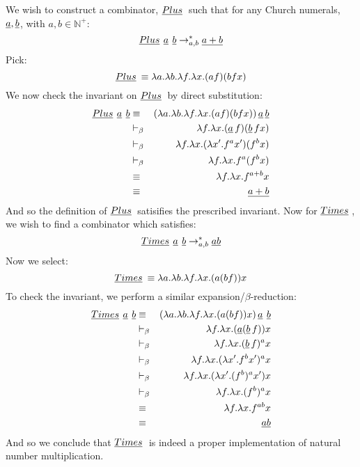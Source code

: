 \documentclass{article}
\begin{document}
We wish to construct a combinator, $\mathop{\underline{Plus}} \:$ such that for any Church numerals, $\mathop{\underline{a}}, \mathop{\underline{b}}$, with $a, b \in \mathbb{N}^+$:
\[ \mathop{\underline{Plus}} \: \mathop{\underline{a}} \: \mathop{\underline{b}} \to^*_{a,b} \mathop{\underline{a + b}} \]
Pick:
\[ \mathop{\underline{Plus}} \: \equiv \lambda a . \lambda b . \lambda f . \lambda x . (a f) (b f x) \]
We now check the invariant on $\mathop{\underline{Plus}} \:$ by direct substitution:
\begin{eqnarray*}
\mathop{\underline{Plus}} \: \mathop{\underline{a}} \: \mathop{\underline{b}} & \equiv & (\lambda a . \lambda b . \lambda f . \lambda x . (a f) (b f x)) \mathop{\underline{a}} \mathop{\underline{b}}\\
& \vdash_\beta & \lambda f. \lambda x. (\mathop{\underline{a}} f) (\mathop{\underline{b}} f x) \\
& \vdash_\beta & \lambda f. \lambda x. (\lambda x'. f^a x') (f^b x) \\
& \vdash_\beta & \lambda f. \lambda x. f^a ( f^b x) \\
& \equiv & \lambda f. \lambda x. f^{a + b} x \\
& \equiv & \mathop{\underline{a + b}}
\end{eqnarray*}
And so the definition of $\mathop{\underline{Plus}} \:$ satisifies the prescribed invariant.  Now for $\mathop{\underline{Times}} \:$, we wish to find a combinator which satisfies:
\[ \mathop{\underline{Times}} \: \mathop{\underline{a}} \: \mathop{\underline{b}} \to^*_{a,b} \mathop{\underline{a b}} \]
Now we select:
\[ \mathop{\underline{Times}} \: \equiv \lambda a . \lambda b . \lambda f . \lambda x . (a ( b f )) x  \]
To check the invariant, we perform a similar expansion/$\beta$-reduction:
\begin{eqnarray*}
\mathop{\underline{Times}} \: \mathop{\underline{a}} \: \mathop{\underline{b}} & \equiv & (\lambda a . \lambda b . \lambda f . \lambda x . (a ( b f )) x) \mathop{\underline{a}} \: \mathop{\underline{b}} \\
& \vdash_\beta & \lambda f . \lambda x . (\mathop{\underline{a}} ( \mathop{\underline{b}} f )) x \\
& \vdash_\beta & \lambda f . \lambda x . (\mathop{\underline{b}} f)^a x \\
& \vdash_\beta & \lambda f . \lambda x . (\lambda x' . f^b x')^a x \\
& \vdash_\beta & \lambda f. \lambda x . (\lambda x' . (f^b)^a x') x \\
& \vdash_\beta & \lambda f. \lambda x . (f^b)^a x \\
& \equiv & \lambda f. \lambda x. f^{a b} x \\
& \equiv & \mathop{\underline{a b}}
\end{eqnarray*}
And so we conclude that $\mathop{\underline{Times}} \:$ is indeed a proper implementation of natural number multiplication.
\end{document}

